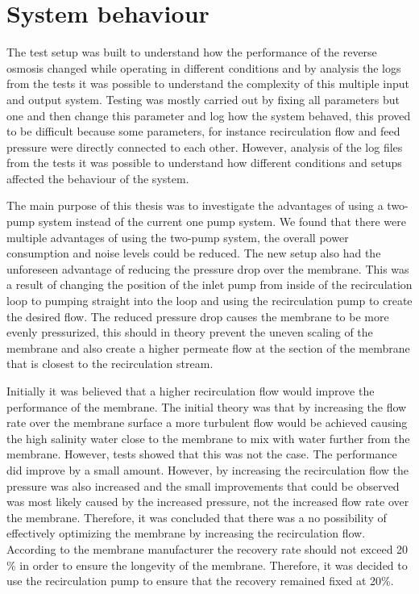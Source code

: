

\section{System behaviour} 



The test setup was built to understand how the performance of the reverse osmosis changed while operating in different conditions and by analysis the logs from the tests it was possible to understand the complexity of this multiple input and output system. Testing was mostly carried out by fixing all parameters but one and then change this parameter and log how the system behaved, this proved to be difficult because some parameters, for instance recirculation flow and feed pressure were directly connected to each other. However, analysis of the log files from the tests it was possible to understand how different conditions and setups affected the behaviour of the system. 

The main purpose of this thesis was to investigate the advantages of using a two-pump system instead of the current one pump system. We found that there were multiple advantages of using the two-pump system, the overall power consumption and noise levels could be reduced. The new setup also had the unforeseen advantage of reducing the pressure drop over the membrane. This was a result of changing the position of the inlet pump from inside of the recirculation loop to pumping straight into the loop and using the recirculation pump to create the desired flow. The reduced pressure drop causes the membrane to be more evenly pressurized, this should in theory prevent the uneven scaling of the membrane and also create a higher permeate flow at the section of the membrane that is closest to the recirculation stream.

Initially it was believed that a higher recirculation flow would improve the performance of the membrane. The initial theory was that by increasing the flow rate over the membrane surface a more turbulent flow would be achieved causing the high salinity water close to the membrane to mix with water further from the membrane. However, tests showed that this was not the case. The performance did improve by a small amount. However, by increasing the recirculation flow the pressure was also increased and the small improvements that could be observed was most likely caused by the increased pressure, not the increased flow rate over the membrane. Therefore, it was concluded that there was a no possibility of effectively optimizing the membrane by increasing the recirculation flow. According to the membrane manufacturer the recovery rate should not exceed 20 \% in order to ensure the longevity of the membrane. Therefore, it was decided to use the recirculation pump to ensure that the recovery remained fixed at 20\%.

